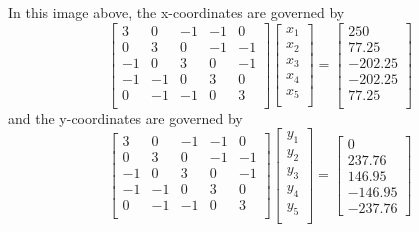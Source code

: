 \documentclass[11pt]{report}
\begin{document}
In this image above, the x-coordinates are governed by
\[
    \begin{bmatrix}
        3  & 0  & -1 & -1 &  0 \\
        0  & 3  &  0 & -1 & -1 \\
        -1 & 0  &  3 & 0 & -1 \\
        -1 & -1 &  0 & 3 & 0 \\
        0  & -1 & -1 & 0 & 3 \\
    \end{bmatrix}
    \begin{bmatrix}
        x_1 \\
        x_2 \\
        x_3 \\
        x_4 \\
        x_5 \\
    \end{bmatrix}  =
    \begin{bmatrix}
        250 \\
        77.25 \\
        -202.25 \\
        -202.25 \\ 
        77.25 \\
    \end{bmatrix}
\]
and the y-coordinates are governed by
\[
    \begin{bmatrix}
3  & 0  & -1 & -1 &  0 \\
0  & 3  &  0 & -1 & -1 \\
-1 & 0  &  3 & 0 & -1 \\
-1 & -1 &  0 & 3 & 0 \\
0  & -1 & -1 & 0 & 3 \\
\end{bmatrix}
\begin{bmatrix}
y_1 \\
y_2 \\
y_3 \\
y_4 \\
y_5 \\
\end{bmatrix}  =
    \begin{bmatrix}
0 \\
237.76 \\
146.95 \\
-146.95 \\
-237.76
\end{bmatrix}
\]
\end{document}

